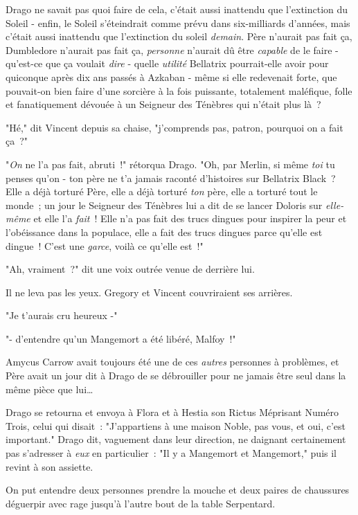 Drago ne savait pas quoi faire de cela, c'était aussi inattendu que l'extinction du Soleil - enfin, le Soleil s'éteindrait comme prévu dans six-milliards d'années, mais c'était aussi inattendu que l'extinction du soleil \emph{demain}. Père n'aurait pas fait ça, Dumbledore n'aurait pas fait ça, \emph{personne} n'aurait dû être \emph{capable} de le faire - qu'est-ce que ça voulait \emph{dire} - quelle \emph{utilité} Bellatrix pourrait-elle avoir pour quiconque après dix ans passés à Azkaban - même si elle redevenait forte, que pouvait-on bien faire d'une sorcière à la fois puissante, totalement maléfique, folle et fanatiquement dévouée à un Seigneur des Ténèbres qui n'était plus là~?

"Hé," dit Vincent depuis sa chaise, "j'comprends pas, patron, pourquoi on a fait ça~?"

"\emph{On} ne l'a pas fait, abruti~!" rétorqua Drago. "Oh, par Merlin, si même \emph{toi} tu penses qu'on - ton père ne t'a jamais raconté d'histoires sur Bellatrix Black~? Elle a déjà torturé Père, elle a déjà torturé \emph{ton} père, elle a torturé tout le monde~; un jour le Seigneur des Ténèbres lui a dit de se lancer Doloris sur \emph{elle-même} et elle l'a \emph{fait}~! Elle n'a pas fait des trucs dingues pour inspirer la peur et l'obéissance dans la populace, elle a fait des trucs dingues parce qu'elle est dingue~! C'est une \emph{garce}, voilà ce qu'elle est~!"

"Ah, vraiment~?" dit une voix outrée venue de derrière lui.

Il ne leva pas les yeux. Gregory et Vincent couvriraient ses arrières.

"Je t'aurais cru heureux -"

"- d'entendre qu'un Mangemort a été libéré, Malfoy~!"

Amycus Carrow avait toujours été une de ces \emph{autres} personnes à problèmes, et Père avait un jour dit à Drago de se débrouiller pour ne jamais être seul dans la même pièce que lui…

Drago se retourna et envoya à Flora et à Hestia son Rictus Méprisant Numéro Trois, celui qui disait~: "J'appartiens à une maison Noble, pas vous, et oui, c'est important." Drago dit, vaguement dans leur direction, ne daignant certainement pas s'adresser à \emph{eux} en particulier~: "Il y a Mangemort et Mangemort," puis il revint à son assiette.

On put entendre deux personnes prendre la mouche et deux paires de chaussures déguerpir avec rage jusqu'à l'autre bout de la table Serpentard.

